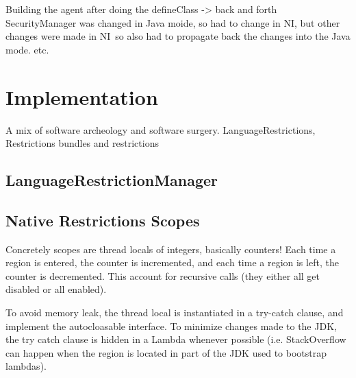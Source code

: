 Building the agent after doing the defineClass -> back and forth
SecurityManager was changed in Java moide, so had to change in NI, but other changes were made in NI so also had to propagate back the changes into the Java mode.
etc.


\chapter{Implementation}
A mix of software archeology and software surgery.
LanguageRestrictions, Restrictions bundles and restrictions


\section{LanguageRestrictionManager}


\section{Native Restrictions Scopes}
Concretely scopes are thread locals of integers, basically counters!
Each time a region is entered, the counter is incremented, and each time a region is left, the counter is decremented. This account for recursive calls (they either all get disabled or all enabled).

To avoid memory leak, the thread local is instantiated in a try-catch clause, and implement the autocloasable interface.
To minimize changes made to the JDK, the try catch clause is hidden in a Lambda whenever possible (i.e. StackOverflow can happen when the region is located in part of the JDK used to bootstrap lambdas).


